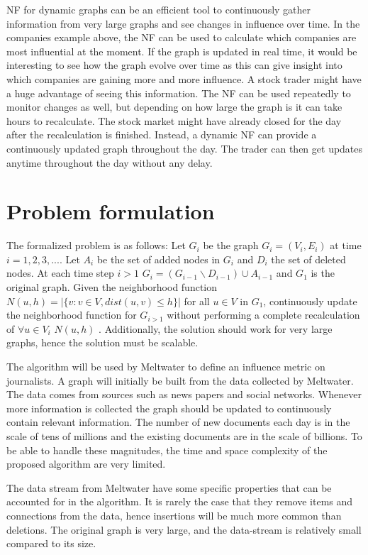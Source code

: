 NF for dynamic graphs can be an efficient tool to continuously gather information from very large graphs and see changes in influence over time. In the companies example above, the NF can be used to calculate which companies are most influential at the moment. If the graph is updated in real time, it would be interesting to see how the graph evolve over time as this can give insight into which companies are gaining more and more influence. A stock trader might have a huge advantage of seeing this information. The NF can be used repeatedly to monitor changes as well, but depending on how large the graph is it can take hours to recalculate. The stock market might have already closed for the day after the recalculation is finished. Instead, a dynamic NF can provide a continuously updated graph throughout the day. The trader can then get updates anytime throughout the day without any delay.

\section{Problem formulation}
The formalized problem is as follows: 
Let $G_i$ be the graph $G_i = (V_i,E_i)$ at time $i = 1,2,3,...$.
Let $A_i$ be the set of added nodes in $G_i$ and $D_i$ the set of deleted nodes. 
At each time step $i > 1$ $G_i = (G_{i-1} \backslash D_{i-1}) \cup A_{i-1}$ and $G_1$ is the original graph. Given the neighborhood function $N(u, h) = |\{v : v \in V, dist(u,v) \leq h \}|$ for all $u \in V$ in $G_1$, continuously update the neighborhood function for $G_{i>1}$ without performing a complete recalculation of $\forall u \in V_i$ $N(u, h)$ . Additionally, the solution should work for very large graphs, hence the solution must be scalable. 

The algorithm will be used by Meltwater to define an influence metric on journalists. A graph will initially be built from the data collected by Meltwater. The data comes from sources such as news papers and social networks. Whenever more information is collected the graph should be updated to continuously contain relevant information. The number of new documents each day is in the scale of tens of millions and the existing documents are in the scale of billions. To be able to handle these magnitudes, the time and space complexity of the proposed algorithm are very limited.

The data stream from Meltwater have some specific properties that can be accounted for in the algorithm. It is rarely the case that they remove items and connections from the data, hence insertions will be much more common than deletions. The original graph is very large, and the data-stream is relatively small compared to its size. 

